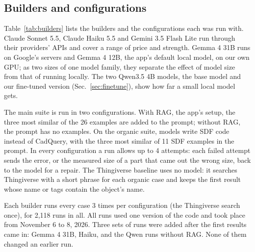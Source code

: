 \subsection{Builders and configurations}
Table~\ref{tab:builders} lists the builders and the configurations each was run with.
Claude Sonnet 5.5, Claude Haiku 5.5 and Gemini 3.5 Flash Lite run through their providers' APIs and cover a range of price and strength.
Gemma 4 31B runs on Google's servers and Gemma 4 12B, the app's default local model, on our own GPU; as two sizes of one model family, they separate the effect of model size from that of running locally.
The two Qwen3.5 4B models, the base model and our fine-tuned version (Sec.~\ref{sec:finetune}), show how far a small local model gets.

The main suite is run in two configurations.
With RAG, the app's setup, the three most similar of the 26 examples are added to the prompt; without RAG, the prompt has no examples.
On the organic suite, models write SDF code instead of CadQuery, with the three most similar of 11 SDF examples in the prompt.
In every configuration a run allows up to 4 attempts: each failed attempt sends the error, or the measured size of a part that came out the wrong size, back to the model for a repair.
The Thingiverse baseline uses no model: it searches Thingiverse with a short phrase for each organic case and keeps the first result whose name or tags contain the object's name.

Each builder runs every case 3 times per configuration (the Thingiverse search once), for 2,118 runs in all.
All runs used one version of the code and took place from November 6 to 8, 2026.
Three sets of runs were added after the first results came in: Gemma 4 31B, Haiku, and the Qwen runs without RAG.
None of them changed an earlier run.

